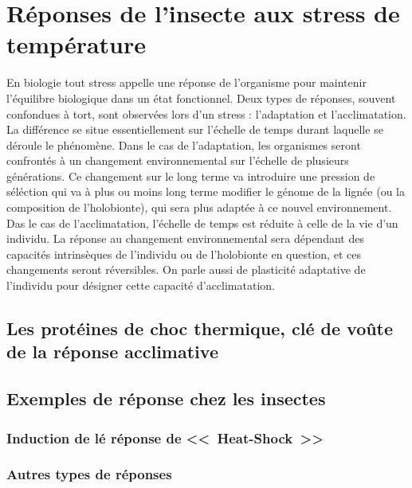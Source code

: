 \chapter{Réponses de l'insecte aux stress de température}

En biologie tout stress appelle une réponse de l'organisme pour maintenir l'équilibre biologique dans un état fonctionnel.
Deux types de réponses, souvent confondues à tort, sont observées lors d'un stress : l'adaptation et l'acclimatation.
La différence se situe essentiellement sur l'échelle de temps durant laquelle se déroule le phénomène.
Dans le cas de l'adaptation, les organismes seront confrontés à un changement environnemental sur l'échelle de plusieurs générations.
Ce changement sur le long terme va introduire une pression de séléction qui va à plus ou moins long terme modifier le génome de la lignée (ou la composition de l'holobionte), qui sera plus adaptée à ce nouvel environnement.
Das le cas de l'acclimatation, l'échelle de temps est réduite à celle de la vie d'un individu. La réponse au changement environnemental sera dépendant des capacités intrinsèques de l'individu ou de l'holobionte en question, et ces changements seront réversibles.
On parle aussi de plasticité adaptative de l'individu pour désigner cette capacité d'acclimatation.

	\section{Les protéines de choc thermique, clé de voûte de la réponse acclimative}

	\section{Exemples de réponse chez les insectes}

		\subsection{Induction de lé réponse de <<~Heat-Shock~>>}

		\subsection{Autres types de réponses} %

